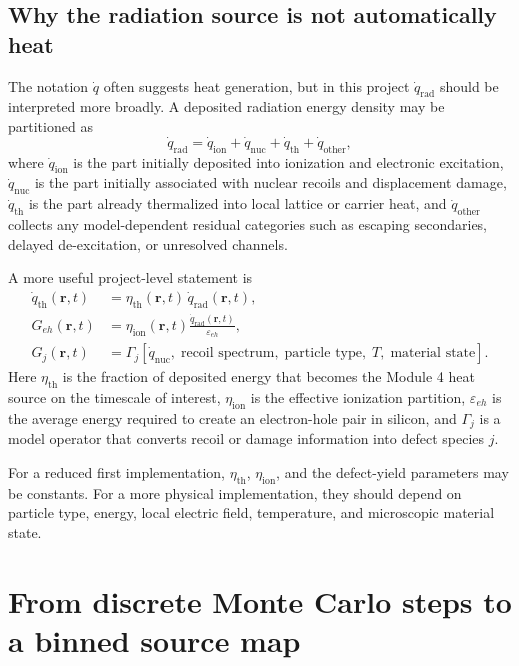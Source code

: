 \documentclass[11pt]{article}
\newcommand{\qrad}{\dot{q}_{\mathrm{rad}}}
\newcommand{\qth}{\dot{q}_{\mathrm{th}}}
\newcommand{\qion}{\dot{q}_{\mathrm{ion}}}
\newcommand{\qnuc}{\dot{q}_{\mathrm{nuc}}}
\newcommand{\rpos}{\mathbf{r}}
\newcommand{\epspair}{\varepsilon_{eh}}
\newcommand{\Geh}{G_{eh}}
\begin{document}
\subsection{Why the radiation source is not automatically heat}

The notation $\dot{q}$ often suggests heat generation, but in this project $\qrad$ should be interpreted more broadly. A deposited radiation energy density may be partitioned as
\begin{equation}
\qrad
=
\qion + \qnuc + \qth + \dot{q}_{\mathrm{other}},
\label{eq:qrad_partition_schematic}
\end{equation}
where $\qion$ is the part initially deposited into ionization and electronic excitation, $\qnuc$ is the part initially associated with nuclear recoils and displacement damage, $\qth$ is the part already thermalized into local lattice or carrier heat, and $\dot{q}_{\mathrm{other}}$ collects any model-dependent residual categories such as escaping secondaries, delayed de-excitation, or unresolved channels.

A more useful project-level statement is
\begin{align}
\qth(\rpos,t) &= \eta_{\mathrm{th}}(\rpos,t)\,\qrad(\rpos,t), \\
\Geh(\rpos,t) &= \eta_{\mathrm{ion}}(\rpos,t)\frac{\qrad(\rpos,t)}{\epspair}, \\
G_j(\rpos,t) &= \Gamma_j\!\left[\qnuc,\;\text{recoil spectrum},\;\text{particle type},\;T,\;\text{material state}\right].
\end{align}
Here $\eta_{\mathrm{th}}$ is the fraction of deposited energy that becomes the Module 4 heat source on the timescale of interest, $\eta_{\mathrm{ion}}$ is the effective ionization partition, $\epspair$ is the average energy required to create an electron-hole pair in silicon, and $\Gamma_j$ is a model operator that converts recoil or damage information into defect species $j$.

\begin{notebox}
For a reduced first implementation, $\eta_{\mathrm{th}}$, $\eta_{\mathrm{ion}}$, and the defect-yield parameters may be constants. For a more physical implementation, they should depend on particle type, energy, local electric field, temperature, and microscopic material state.
\end{notebox}

\section{From discrete Monte Carlo steps to a binned source map}
\end{document}
